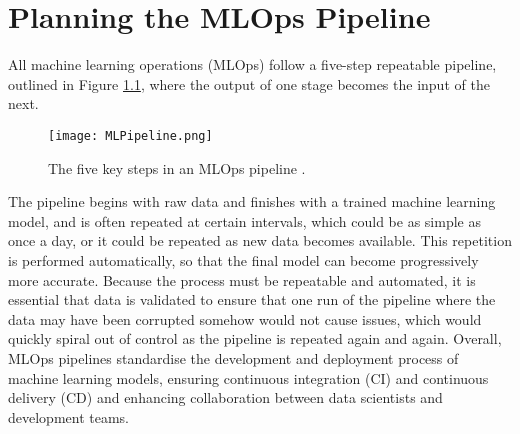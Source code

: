 \chapter{Planning the MLOps Pipeline}\label{ch:PlanMLOps}
All machine learning operations (MLOps) follow a five-step repeatable pipeline, outlined in Figure \ref{fig:MLPipeline}, where the output of one stage
becomes the input of the next. 
\begin{figure}[H]
    \centering
    \texttt{[image: MLPipeline.png]}
    \caption{The five key steps in an MLOps pipeline \autocite{incycle_software_mlops_nodate}.}
    \label{fig:MLPipeline}
\end{figure}
The pipeline begins with raw data and finishes with a trained machine learning model, and is often 
repeated at certain intervals, which could be as simple as once a day, or it could be repeated as new data becomes available. 
This repetition is performed automatically, so that the final model can become progressively more accurate. Because the process 
must be repeatable and automated, it is essential that data is validated to ensure that one run of the pipeline where the data may have 
been corrupted somehow would not cause issues, which would quickly spiral out of control as the pipeline is repeated again and again.
Overall, MLOps pipelines standardise the development and deployment process of machine learning models, ensuring continuous integration
(CI) and continuous delivery (CD) and enhancing collaboration between data scientists and development teams.

\pagebreak